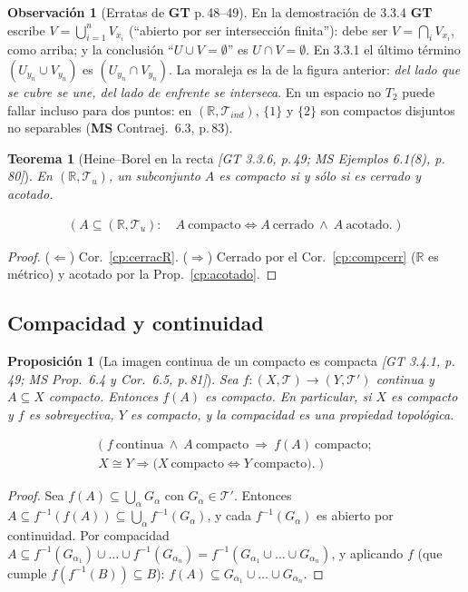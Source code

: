 \documentclass[11pt,a4paper]{article}
\newcommand{\lgc}[1]{\par\vspace{-3pt}\begin{gather*}\big(\;#1\;\big)\end{gather*}\vspace{-6pt}}
\theoremstyle{definition}
\newtheorem{observacion}[definicion]{Observación}
\theoremstyle{plain}
\newtheorem{teorema}[definicion]{Teorema}
\newtheorem{proposicion}[definicion]{Proposición}
\newcommand{\fnt}[1]{{\normalfont\small\itshape\color{gray!150!black}[#1]}}
\newcommand{\R}{\mathbb{R}}
\newcommand{\tp}{\mathcal{T}}
\begin{document}
\begin{observacion}[Erratas de \textbf{GT} p.\,48--49]
En la demostración de 3.3.4 \textbf{GT} escribe $V=\bigcup_{i=1}^nV_{x_i}$ (``abierto por ser intersección finita''): debe ser $V=\bigcap_iV_{x_i}$, como arriba; y la conclusión ``$U\cup V=\emptyset$'' es $U\cap V=\emptyset$. En 3.3.1 el último término $(U_{y_n}\cup V_{y_n})$ es $(U_{y_n}\cap V_{y_n})$. La moraleja es la de la figura anterior: \emph{del lado que se cubre se une, del lado de enfrente se interseca}. En un espacio no $T_2$ puede fallar incluso para dos puntos: en $(\R,\tp_{ind})$, $\{1\}$ y $\{2\}$ son compactos disjuntos no separables (\textbf{MS} Contraej.\ 6.3, p.\,83).
\end{observacion}

\begin{teorema}[Heine--Borel en la recta \fnt{GT 3.3.6, p.\,49; MS Ejemplos 6.1(8), p.\,80}]\label{cp:HBR}
En $(\R,\tp_u)$, un subconjunto $A$ es compacto si y sólo si es cerrado y acotado.
\lgc{A\subseteq(\R,\tp_u):\quad A\ \text{compacto}\iff A\ \text{cerrado}\ \wedge\ A\ \text{acotado}.}
\end{teorema}

\begin{proof}
($\Leftarrow$) Cor.~\ref{cp:cerracR}. ($\Rightarrow$) Cerrado por el Cor.~\ref{cp:compcerr} ($\R$ es métrico) y acotado por la Prop.~\ref{cp:acotado}.
\end{proof}

\subsection[Compacidad y continuidad]{Compacidad y continuidad}\label{cp:sub-cont}

\begin{proposicion}[La imagen continua de un compacto es compacta \fnt{GT 3.4.1, p.\,49; MS Prop.\ 6.4 y Cor.\ 6.5, p.\,81}]\label{cp:imcomp}
Sea $f:(X,\tp)\to(Y,\tp')$ continua y $A\subseteq X$ compacto. Entonces $f(A)$ es compacto. En particular, si $X$ es compacto y $f$ es sobreyectiva, $Y$ es compacto, y la compacidad es una propiedad topológica.
\lgc{f\ \text{continua}\ \wedge\ A\ \text{compacto}\ \Rightarrow\ f(A)\ \text{compacto};\\ X\cong Y\Rightarrow\big(X\ \text{compacto}\iff Y\ \text{compacto}\big).}
\end{proposicion}

\begin{proof}
Sea $f(A)\subseteq\bigcup_\alpha G_\alpha$ con $G_\alpha\in\tp'$. Entonces $A\subseteq f^{-1}(f(A))\subseteq\bigcup_\alpha f^{-1}(G_\alpha)$, y cada $f^{-1}(G_\alpha)$ es abierto por continuidad. Por compacidad $A\subseteq f^{-1}(G_{\alpha_1})\cup\dots\cup f^{-1}(G_{\alpha_n})=f^{-1}(G_{\alpha_1}\cup\dots\cup G_{\alpha_n})$, y aplicando $f$ (que cumple $f(f^{-1}(B))\subseteq B$): $f(A)\subseteq G_{\alpha_1}\cup\dots\cup G_{\alpha_n}$.
\end{proof}
\end{document}
